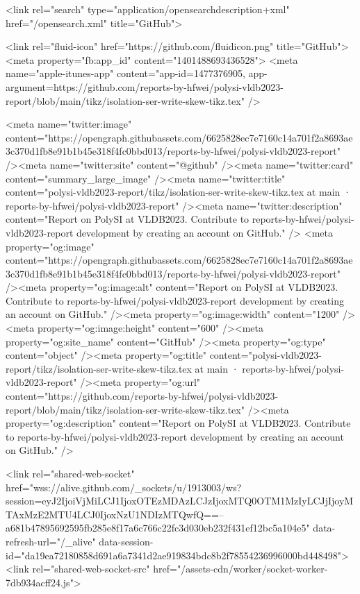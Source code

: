       <link rel="search" type="application/opensearchdescription+xml" href="/opensearch.xml" title="GitHub">

    <link rel="fluid-icon" href="https://github.com/fluidicon.png" title="GitHub">
    <meta property="fb:app_id" content="1401488693436528">
    <meta name="apple-itunes-app" content="app-id=1477376905, app-argument=https://github.com/reports-by-hfwei/polysi-vldb2023-report/blob/main/tikz/isolation-ser-write-skew-tikz.tex" />

      <meta name="twitter:image" content="https://opengraph.githubassets.com/6625828ec7e7160c14a701f2a8693ae3c370d1fb8e91b1b45e318f4fc0bbd013/reports-by-hfwei/polysi-vldb2023-report" /><meta name="twitter:site" content="@github" /><meta name="twitter:card" content="summary_large_image" /><meta name="twitter:title" content="polysi-vldb2023-report/tikz/isolation-ser-write-skew-tikz.tex at main · reports-by-hfwei/polysi-vldb2023-report" /><meta name="twitter:description" content="Report on PolySI at VLDB2023. Contribute to reports-by-hfwei/polysi-vldb2023-report development by creating an account on GitHub." />
  <meta property="og:image" content="https://opengraph.githubassets.com/6625828ec7e7160c14a701f2a8693ae3c370d1fb8e91b1b45e318f4fc0bbd013/reports-by-hfwei/polysi-vldb2023-report" /><meta property="og:image:alt" content="Report on PolySI at VLDB2023. Contribute to reports-by-hfwei/polysi-vldb2023-report development by creating an account on GitHub." /><meta property="og:image:width" content="1200" /><meta property="og:image:height" content="600" /><meta property="og:site_name" content="GitHub" /><meta property="og:type" content="object" /><meta property="og:title" content="polysi-vldb2023-report/tikz/isolation-ser-write-skew-tikz.tex at main · reports-by-hfwei/polysi-vldb2023-report" /><meta property="og:url" content="https://github.com/reports-by-hfwei/polysi-vldb2023-report/blob/main/tikz/isolation-ser-write-skew-tikz.tex" /><meta property="og:description" content="Report on PolySI at VLDB2023. Contribute to reports-by-hfwei/polysi-vldb2023-report development by creating an account on GitHub." />
  


      <link rel="shared-web-socket" href="wss://alive.github.com/_sockets/u/1913003/ws?session=eyJ2IjoiVjMiLCJ1IjoxOTEzMDAzLCJzIjoxMTQ0OTM1MzIyLCJjIjoyMTAxMzE2MTU4LCJ0IjoxNzU1NDIzMTQwfQ==--a681b47895692595fb285e8f17a6c766c22fc3d030eb232f431ef12bc5a104e5" data-refresh-url="/_alive" data-session-id="da19ea72180858d691a6a7341d2ae919834bdc8b2f78554236996000bd448498">
      <link rel="shared-web-socket-src" href="/assets-cdn/worker/socket-worker-7db934acff24.js">


